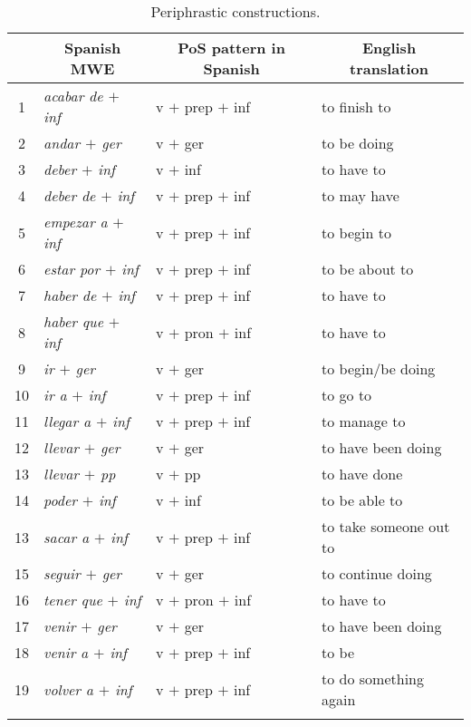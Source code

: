 \documentclass[output=paper]{langsci/langscibook}
\begin{document}
\begin{table}[H]
\centering
\caption{Periphrastic constructions.}
\label{tab:periphrasis}
\begin{tabular}{c|lll}
\lsptoprule
& \multicolumn{1}{c}{\textbf{Spanish MWE}} & \multicolumn{1}{c}{\textbf{PoS pattern in Spanish}} & \multicolumn{1}{c}{\textbf{English translation}} \\ %
\midrule
1 & \textit{acabar de $+$ inf} & v $+$ prep $+$ inf & to finish to\\
2 & \textit{andar $+$ ger} & v $+$ ger & to be doing\\
3 & \textit{deber $+$ inf} & v $+$ inf & to have to \\
4 & \textit{deber de $+$ inf} & v $+$ prep $+$ inf & to may have \\
5 & \textit{empezar a $+$ inf} & v $+$ prep $+$ inf & to begin to \\
6 & \textit{estar por $+$ inf} & v $+$ prep $+$ inf & to be about to \\
7 & \textit{haber de $+$ inf} & v $+$ prep $+$ inf & to have to \\
8 & \textit{haber que $+$ inf} & v $+$ pron $+$ inf & to have to \\
9 & \textit{ir $+$ ger} & v $+$ ger & to begin/be doing\\
10 & \textit{ir a $+$ inf} & v $+$ prep $+$ inf & to go to \\
11 & \textit{llegar a $+$ inf} & v $+$ prep $+$ inf & to manage to \\
12 & \textit{llevar $+$ ger} & v $+$ ger & to have been doing \\
13 & \textit{llevar $+$ pp} & v $+$ pp & to have done \\
14 & \textit{poder $+$ inf} & v $+$ inf & to be able to \\
13 & \textit{sacar a $+$ inf} & v $+$ prep $+$ inf & to take someone out to \\
15 & \textit{seguir $+$ ger} & v $+$ ger & to continue doing \\
16 & \textit{tener que $+$ inf} & v $+$ pron $+$ inf & to have to \\
17 & \textit{venir $+$ ger} & v $+$ ger & to have been doing \\
18 & \textit{venir a $+$ inf} & v $+$ prep $+$ inf & to be \\
19 & \textit{volver a $+$ inf} & v $+$ prep $+$ inf & to do something again\\
\lspbottomrule
\end{tabular}
\end{table}
\end{document}
